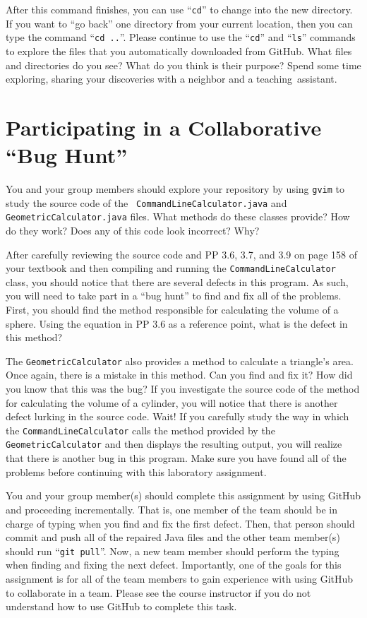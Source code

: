\documentclass[11pt]{article}
\newcommand{\command}[1]{``\lstinline{#1}''}
\newcommand{\step}[1]{``{#1}''}
\begin{document}
After this command finishes, you can use \command{cd} to change into the new directory. If you want to \step{go back}
one directory from your current location, then you can type the command \command{cd ..}. Please continue to use the
\command{cd} and \command{ls} commands to explore the files that you automatically downloaded from GitHub. What files
and directories do you see? What do you think is their purpose? Spend some time exploring, sharing your discoveries with
a neighbor and a \mbox{teaching assistant}.

\section*{Participating in a Collaborative ``Bug Hunt''}

You and your group members should explore your repository by using {\tt gvim} to study the source code of the {\tt
CommandLineCalculator.java} and {\tt GeometricCalculator.java} files. What methods do these classes provide? How do they
work? Does any of this code look incorrect? Why?

After carefully reviewing the source code and PP 3.6, 3.7, and 3.9 on page 158 of your textbook and then compiling and
running the {\tt CommandLineCalculator} class, you should notice that there are several defects in this program. As such,
you will need to take part in a ``bug hunt'' to find and fix all of the problems. First, you should find the method
responsible for calculating the volume of a sphere. Using the equation in PP 3.6 as a reference point, what is the
defect in this method?

The {\tt GeometricCalculator} also provides a method to calculate a triangle's area. Once again, there is a mistake in
this method. Can you find and fix it? How did you know that this was the bug? If you investigate the source code of the
method for calculating the volume of a cylinder, you will notice that there is another defect lurking in the source
code. Wait! If you carefully study the way in which the {\tt CommandLineCalculator} calls the method provided by the {\tt
GeometricCalculator} and then displays the resulting output, you will realize that there is another bug in this program.
Make sure you have found all of the problems before continuing with this laboratory assignment.

You and your group member(s) should complete this assignment by using GitHub and proceeding incrementally. That is, one
member of the team should be in charge of typing when you find and fix the first defect. Then, that person should commit
and push all of the repaired Java files and the other team member(s) should run \command{git pull}. Now, a new team
member should perform the typing when finding and fixing the next defect. Importantly, one of the goals for this
assignment is for all of the team members to gain experience with using GitHub to collaborate in a team. Please see the
course instructor if you do not understand how to use GitHub to complete this task.
\end{document}
